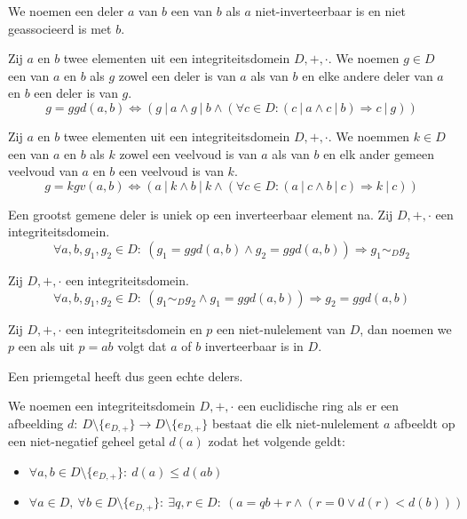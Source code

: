 \documentclass[main.tex]{subfiles}
\begin{document}
\begin{de}
  We noemen een deler $a$ van $b$ een  van $b$ als $a$ niet-inverteerbaar is en niet geassocieerd is met $b$.
\end{de}

\begin{de}
  Zij $a$ en $b$ twee elementen uit een integriteitsdomein $D,+,\cdot$.
  We noemen $g\in D$ een  van $a$ en $b$ als $g$ zowel een deler is van $a$ als van $b$ en elke andere deler van $a$ en $b$ een deler is van $g$.
  \[ g = ggd(a,b) \Leftrightarrow (g\ |\ a \wedge g\ |\ b \wedge (\forall c\in D: (c\ |\ a \wedge c\ |\ b) \Rightarrow c\ |\ g)) \]
\end{de}

\begin{de}
  Zij $a$ en $b$ twee elementen uit een integriteitsdomein $D,+,\cdot$.
  We noemmen $k\in D$ een  van $a$ en $b$ als $k$ zowel een veelvoud is van $a$ als van $b$ en elk ander gemeen veelvoud van $a$ en $b$ een veelvoud is van $k$.
  \[ g = kgv(a,b) \Leftrightarrow (a\ |\ k \wedge b\ |\ k \wedge (\forall c\in D: (a\ |\ c \wedge b\ |\ c) \Rightarrow k\ |\ c)) \]
\end{de}

\begin{st}
  Een grootst gemene deler is uniek op een inverteerbaar element na.
  Zij $D,+,\cdot$ een integriteitsdomein.
  \[ \forall a,b,g_{1},g_{2} \in D:\ (g_{1} = ggd(a,b) \wedge g_{2} = ggd(a,b)) \Rightarrow g_{1} \sim_{D} g_{2} \]
\end{st}

\begin{st}
  Zij $D,+,\cdot$ een integriteitsdomein.
  \[ \forall a,b,g_{1},g_{2} \in D:\ (g_{1} \sim_{D} g_{2} \wedge g_{1} = ggd(a,b)) \Rightarrow g_{2} = ggd(a,b) \]
\end{st}

\begin{de}
  Zij $D,+,\cdot$ een integriteitsdomein en $p$ een niet-nulelement van $D$, dan noemen we $p$ een  als uit $p=ab$ volgt dat $a$ of $b$ inverteerbaar is in $D$.
\end{de}

\begin{opm}
  Een priemgetal heeft dus geen echte delers.
\end{opm}

\begin{de}
  We noemen een integriteitsdomein $D,+,\cdot$ een euclidische ring als er een afbeelding $d:\ D\setminus \{e_{D,+}\} \rightarrow D \setminus \{e_{D,+}\}$ bestaat die elk niet-nulelement $a$ afbeeldt op een niet-negatief geheel getal $d(a)$ zodat het volgende geldt:
\begin{itemize}
\item $\forall a,b \in D\setminus \{e_{D,+}\}:\ d(a) \le d(ab)$
\item $\forall a \in D,\ \forall b\in D\setminus \{e_{D,+}\}:\ \exists q,r \in D:\ (a = qb+r \wedge (r=0 \vee d(r) < d(b)))$
\end{itemize}
\end{de}
\end{document}
